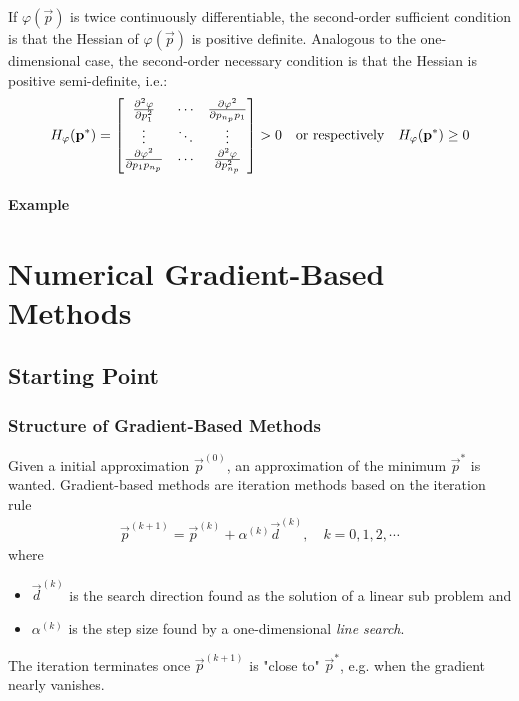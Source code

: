 			If \(\varphi(\vec{p})\) is twice continuously differentiable, the second-order sufficient condition is that the Hessian of \(\varphi(\vec{p})\) is positive definite. Analogous to the one-dimensional case, the second-order necessary condition is that the Hessian is positive semi-definite, i.e.:
			\begin{align*}
				H_\varphi(\boldsymbol{\mathrm{p}}^\ast) =
					\begin{bmatrix}
						\pdv[2]{\varphi}{p_1}        & \cdots & \pdv{\varphi^2}{p_{n_p} p_1} \\
						\vdots                       & \ddots & \vdots                       \\
						\pdv{\varphi^2}{p_1 p_{n_p}} & \cdots & \pdv[2]{\varphi}{p_{n_p}}
					\end{bmatrix}
				> 0
				\quad\text{or respectively}\quad
				H_\varphi(\boldsymbol{\mathrm{p}}^\ast) \geq 0
			\end{align*}

			\paragraph{Example} %

	\section{Numerical Gradient-Based Methods}
		\subsection{Starting Point}
			\subsubsection{Structure of Gradient-Based Methods}
				Given a initial approximation \( \vec{p}^{(0)} \), an approximation of the minimum \( \vec{p}^\ast \) is wanted. Gradient-based methods are iteration methods based on the iteration rule
				\begin{align*}
					\vec{p}^{(k + 1)} = \vec{p}^{(k)} + \alpha^{(k)} \vec{d}^{(k)},\quad k = 0, 1, 2, \cdots
				\end{align*}
				where
				\begin{itemize}
					\item \(\vec{d}^{(k)}\) is the search direction found as the solution of a linear sub problem and
					\item \(\alpha^{(k)}\) is the step size found by a one-dimensional \emph{line search}.
				\end{itemize}
				The iteration terminates once \( \vec{p}^{(k + 1)} \) is "close to" \(\vec{p}^\ast\), e.g. when the gradient nearly vanishes.


